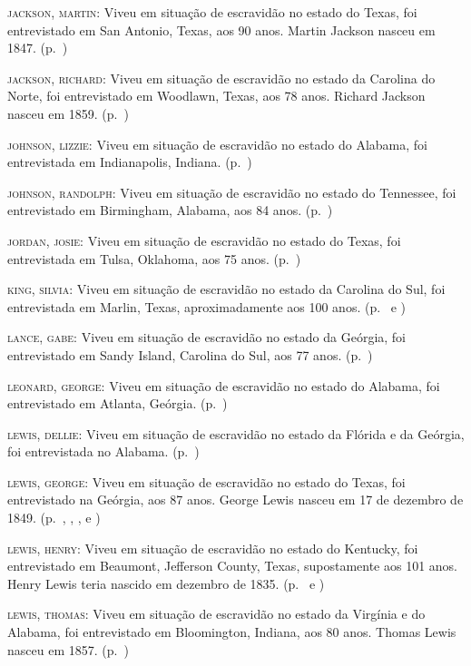 \begin{Parskip}
\textsc{jackson, martin:} Viveu em situação de escravidão no estado do Texas, foi entrevistado
em San Antonio, Texas, aos 90 anos. Martin Jackson nasceu em 1847. (p.~\pageref{ref161})

\textsc{jackson, richard:} Viveu em situação de escravidão no estado da Carolina do Norte, foi
entrevistado em Woodlawn, Texas, aos 78 anos. Richard Jackson nasceu em
1859. (p.~\pageref{ref162})

\textsc{johnson, lizzie:} Viveu em situação de escravidão no estado do Alabama, foi entrevistada
em Indianapolis, Indiana. (p.~\pageref{ref163})

\textsc{johnson, randolph:} Viveu em situação de escravidão no estado do Tennessee, foi
entrevistado em Birmingham, Alabama, aos 84 anos. (p.~\pageref{ref164})

\textsc{jordan, josie:} Viveu em situação de escravidão no estado do Texas, foi entrevistada em
Tulsa, Oklahoma, aos 75 anos. (p.~\pageref{ref165})

\textsc{king, silvia:} Viveu em situação de escravidão no estado da Carolina do Sul, foi
entrevistada em Marlin, Texas, aproximadamente aos 100 anos. (p.~\pageref{ref166} e \pageref{ref167})

\textsc{lance, gabe:} Viveu em situação de escravidão no estado da Geórgia, foi entrevistado em
Sandy Island, Carolina do Sul, aos 77 anos. (p.~\pageref{ref168})

\textsc{leonard, george:} Viveu em situação de escravidão no estado do Alabama, foi entrevistado
em Atlanta, Geórgia. (p.~\pageref{ref169})

\textsc{lewis, dellie:} Viveu em situação de escravidão no estado da Flórida e da Geórgia, foi
entrevistada no Alabama. (p.~\pageref{ref170})

\textsc{lewis, george:} Viveu em situação de escravidão no estado do Texas, foi entrevistado na
Geórgia, aos 87 anos. George Lewis nasceu em 17 de dezembro de 1849. (p.~\pageref{ref171}, \pageref{ref172}, \pageref{ref173}, \pageref{ref174} e \pageref{ref175})

\textsc{lewis, henry:} Viveu em situação de escravidão no estado do Kentucky, foi entrevistado
em Beaumont, Jefferson County, Texas, supostamente aos 101 anos. Henry
Lewis teria nascido em dezembro de 1835. (p.~\pageref{ref176} e \pageref{ref177})

\textsc{lewis, thomas:} Viveu em situação de escravidão no estado da Virgínia e do Alabama, foi
entrevistado em Bloomington, Indiana, aos 80 anos. Thomas Lewis nasceu
em 1857. (p.~\pageref{ref178})


\end{Parskip}
